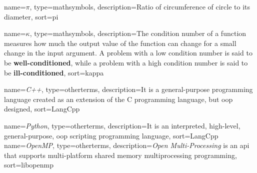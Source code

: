
{
    name={\ensuremath{\pi}},
    type=mathsymbols,
    description={Ratio of circumference of circle to its diameter},
    sort=pi
}

{
    name={\ensuremath{\kappa}},
    type=mathsymbols,
    description={The condition number of a function measures how much the output value of the function can change for a small change in the input argument. A problem with a low condition number is said to be \textbf{well-conditioned}, while a problem with a high condition number is said to be \textbf{ill-conditioned}},
    sort=kappa
}

{
    name={\textit{C++}},
    type=otherterms,
    description={It is a general-purpose programming language created as an extension of the C programming language, but \gls{oop} designed},
    sort=LangCpp
}

{
    name={\textit{Python}},
    type=otherterms,
    description={It is an interpreted, high-level, general-purpose, \gls{oop} scripting programming language},
    sort=LangCpp
}
%
{
    name={\textit{OpenMP}},
    type=otherterms,
    description={\textit{Open Multi-Processing} is an \gls{api} that supports multi-platform shared memory multiprocessing programming},
    sort=libopenmp
}
